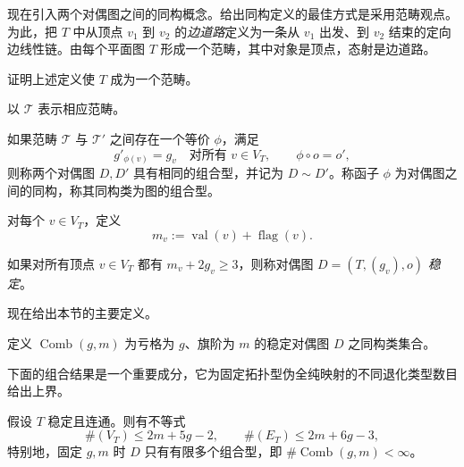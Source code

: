 现在引入两个对偶图之间的同构概念。给出同构定义的最佳方式是采用范畴观点。为此，把 $T$ 中从顶点 $v_1$ 到 $v_2$ 的\emph{边道路}定义为一条从 $v_1$ 出发、到 $v_2$ 结束的定向边线性链。由每个平面图 $T$ 形成一个范畴，其中对象是顶点，态射是边道路。

\begin{exercise}\label{ex:graph-edge-path-category}
证明上述定义使 $T$ 成为一个范畴。
\end{exercise}

以 $\mathcal T$ 表示相应范畴。

\begin{definition}\label{def:dual-graph-isomorphism-combinatorial-type}
如果范畴 $\mathcal T$ 与 $\mathcal T'$ 之间存在一个等价 $\phi$，满足
\[
 g'_{\phi(v)}=g_v\quad\text{对所有 }v\in V_T,
 \qquad \phi\circ o=o',
\]
则称两个对偶图 $D,D'$ 具有相同的组合型，并记为 $D\sim D'$。称函子 $\phi$ 为对偶图之间的同构，称其同构类为图的组合型。
\end{definition}

对每个 $v\in V_T$，定义
\[
 m_v:=\operatorname{val}(v)+\operatorname{flag}(v).
\]

\begin{definition}[稳定性判据]\label{def:stable-dual-graph}
如果对所有顶点 $v\in V_T$ 都有 $m_v+2g_v\geq3$，则称对偶图
$D=(T,(g_v),o)$ \emph{稳定}。
\end{definition}

现在给出本节的主要定义。

\begin{definition}\label{def:comb-stable-dual-graphs}
定义 $\operatorname{Comb}(g,m)$ 为亏格为 $g$、旗阶为 $m$ 的稳定对偶图 $D$ 之同构类集合。
\end{definition}

下面的组合结果是一个重要成分，它为固定拓扑型伪全纯映射的不同退化类型数目给出上界。

\begin{theorem}\label{thm:finiteness-stable-dual-graphs}
假设 $T$ 稳定且连通。则有不等式
\[
 \#(V_T)\leq2m+5g-2,
 \qquad \#(E_T)\leq2m+6g-3,
\]
特别地，固定 $g,m$ 时 $D$ 只有有限多个组合型，即
$\#\operatorname{Comb}(g,m)<\infty$。
\end{theorem}

